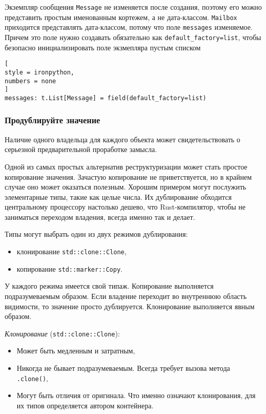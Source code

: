 \documentclass[%
	11pt,
	a4paper,
	utf8,
		]{article}
\begin{document}
Экземпляр сообщения \texttt{Message} не изменяется после создания, поэтому его можно представить простым именованным кортежем, а не дата-классом. \texttt{Mailbox} приходится представлять дата-классом, потому что поле \texttt{messages} изменяемое. Причем это поле нужно создавать обязательно как \verb|default_factory=list|, чтобы безопасно инициализировать поле экзмепляра пустым списком
\begin{lstlisting}[
style = ironpython,
numbers = none
]
messages: t.List[Message] = field(default_factory=list)
\end{lstlisting}

\subsubsection{Продублируйте значение}

Наличие одного владельца для каждого объекта может свидетельствовать о серьезной предварительной проработке замысла.

Одной из самых простых альтернатив реструктуризации может стать простое копирование значения. Зачастую копирование не приветствуется, но в крайнем случае оно может оказаться полезным. Хорошим примером могут послужить элементарные типы, такие как целые числа. Их дублирование обходится центральному процессору настолько дешево, что Rust-компилятор, чтобы не заниматься переходом владения, всегда именно так и делает.

Типы могут выбрать один из двух режимов дублирования:
\begin{itemize}
	\item клонирование \verb|std::clone::Clone|,
	
	\item копирование \verb|std::marker::Copy|.
\end{itemize}

У каждого режима имеется свой типаж. Копирование выполняется подразумеваемым образом. Если владение переходит во внутреннюю область видимости, то значение просто дублируется. Клонирование выполняется явным образом.

\emph{Клонирование} (\verb|std::clone::Clone|):
\begin{itemize}
	\item Может быть медленным и затратным,
	
	\item Никогда не бывает подразумеваемым. Всегда требует вызова метода \verb|.clone()|,
	
	\item Могут быть отличия от оригинала. Что именно означают клонирования, для их типов определяется автором контейнера.
\end{itemize}
\end{document}
